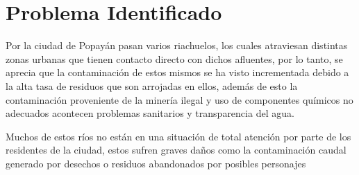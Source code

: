 \section{Problema Identificado}
    Por la ciudad de Popayán pasan varios riachuelos, los cuales atraviesan distintas zonas urbanas que tienen contacto directo con dichos afluentes, por lo tanto, se aprecia que la contaminación de estos mismos se ha visto incrementada debido a la alta tasa de residuos que son arrojadas en ellos, además de esto la contaminación proveniente de la minería ilegal y uso de componentes químicos no adecuados acontecen  problemas sanitarios y transparencia del agua.
    
    Muchos de estos ríos no están en una situación de total atención por parte de los residentes de la ciudad, estos sufren graves daños como la contaminación caudal generado por desechos o residuos abandonados por posibles personajes 
